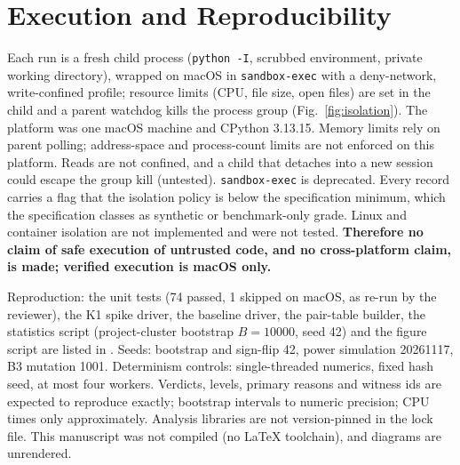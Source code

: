\section{Execution and Reproducibility}\label{sec:execution}
Each run is a fresh child process (\texttt{python -I}, scrubbed environment, private working directory), wrapped on macOS in \texttt{sandbox-exec} with a deny-network, write-confined profile; resource limits (CPU, file size, open files) are set in the child and a parent watchdog kills the process group (Fig.~\ref{fig:isolation}). The platform was one macOS machine and CPython 3.13.15. Memory limits rely on parent polling; address-space and process-count limits are not enforced on this platform. Reads are not confined, and a child that detaches into a new session could escape the group kill (untested). \texttt{sandbox-exec} is deprecated. Every record carries a flag that the isolation policy is below the specification minimum, which the specification classes as synthetic or benchmark-only grade. Linux and container isolation are not implemented and were not tested. \textbf{Therefore no claim of safe execution of untrusted code, and no cross-platform claim, is made; verified execution is macOS only.}

Reproduction: the unit tests (74 passed, 1 skipped on macOS, as re-run by the reviewer), the K1 spike driver, the baseline driver, the pair-table builder, the statistics script (project-cluster bootstrap $B=10000$, seed 42) and the figure script are listed in . Seeds: bootstrap and sign-flip 42, power simulation 20261117, B3 mutation 1001. Determinism controls: single-threaded numerics, fixed hash seed, at most four workers. Verdicts, levels, primary reasons and witness ids are expected to reproduce exactly; bootstrap intervals to numeric precision; CPU times only approximately. Analysis libraries are not version-pinned in the lock file. This manuscript was not compiled (no LaTeX toolchain), and diagrams are unrendered.
